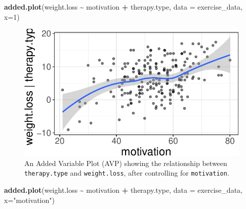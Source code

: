 \documentclass[
  man]{apa6}
\newenvironment{Shaded}{\begin{snugshade}}{\end{snugshade}}
\newcommand{\DataTypeTok}[1]{\textcolor[rgb]{0.13,0.29,0.53}{#1}}
\newcommand{\DecValTok}[1]{\textcolor[rgb]{0.00,0.00,0.81}{#1}}
\newcommand{\KeywordTok}[1]{\textcolor[rgb]{0.13,0.29,0.53}{\textbf{#1}}}
\newcommand{\NormalTok}[1]{#1}
\newcommand{\OperatorTok}[1]{\textcolor[rgb]{0.81,0.36,0.00}{\textbf{#1}}}
\newcommand{\StringTok}[1]{\textcolor[rgb]{0.31,0.60,0.02}{#1}}
\begin{document}
\begin{Shaded}
\begin{Highlighting}[]
\KeywordTok{added.plot}\NormalTok{(weight.loss }\OperatorTok{\textasciitilde{}}\StringTok{ }\NormalTok{motivation }\OperatorTok{+}\StringTok{ }\NormalTok{therapy.type, }\DataTypeTok{data =}\NormalTok{ exercise\_data, }\DataTypeTok{x=}\DecValTok{1}\NormalTok{) }
\end{Highlighting}
\end{Shaded}

\begin{figure}
\centering
\includegraphics{flexplot_psychmeth_files/figure-latex/avp-2.pdf}
\caption{\label{fig:avp-2}An Added Variable Plot (AVP) showing the relationship between \texttt{therapy.type} and \texttt{weight.loss}, after controlling for \texttt{motivation}. \label{fig:avp}}
\end{figure}

\begin{Shaded}
\begin{Highlighting}[]
\KeywordTok{added.plot}\NormalTok{(weight.loss }\OperatorTok{\textasciitilde{}}\StringTok{ }\NormalTok{motivation }\OperatorTok{+}\StringTok{ }\NormalTok{therapy.type, }\DataTypeTok{data =}\NormalTok{ exercise\_data, }\DataTypeTok{x=}\StringTok{"motivation"}\NormalTok{) }
\end{Highlighting}
\end{Shaded}
\end{document}
